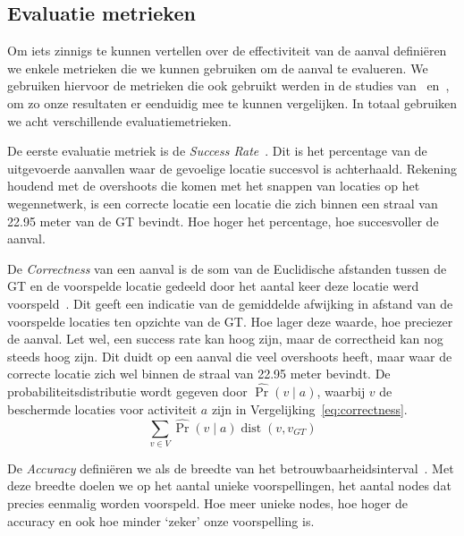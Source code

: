 \subsection{Evaluatie metrieken}
Om iets zinnigs te kunnen vertellen over de effectiviteit van de aanval
definiëren we enkele metrieken die we kunnen gebruiken om de aanval te
evalueren. We gebruiken hiervoor de metrieken die ook gebruikt werden in de
studies van~\citeauthor{Dhondt} en~\citeauthor{Verdonck_2022}, om zo onze
resultaten er eenduidig mee te kunnen vergelijken. In totaal gebruiken we acht
verschillende evaluatiemetrieken.

De eerste evaluatie metriek is de \textit{Success Rate}~\cite{Dhondt}. Dit is
het percentage van de uitgevoerde aanvallen waar de gevoelige locatie succesvol
is achterhaald. Rekening houdend met de overshoots die komen met het snappen
van locaties op het wegennetwerk, is een correcte locatie een locatie die zich
binnen een straal van 22.95 meter van de \ac{GT} bevindt. Hoe hoger het
percentage, hoe succesvoller de aanval.

De \textit{Correctness} van een aanval is de som van de Euclidische afstanden
tussen de \ac{GT} en de voorspelde locatie gedeeld door het aantal keer deze
locatie werd voorspeld~\cite{Dhondt, Verdonck_2022}. Dit geeft een indicatie
van de gemiddelde afwijking in afstand van de voorspelde locaties ten opzichte
van de \ac{GT}. Hoe lager deze waarde, hoe preciezer de aanval. Let wel, een
success rate kan hoog zijn, maar de correctheid kan nog steeds hoog zijn. Dit
duidt op een aanval die veel overshoots heeft, maar waar de correcte locatie
zich wel binnen de straal van 22.95 meter bevindt. De probabiliteitsdistributie
wordt gegeven door $\widehat{\operatorname{Pr}}(v \mid a)$, waarbij $v$ de
beschermde locaties voor activiteit $a$ zijn in
Vergelijking~\ref{eq:correctness}.
\begin{equation}
    \sum_{v \in V} \widehat{\operatorname{Pr}}(v \mid a) \operatorname{dist}\left(v, v_{G T}\right)\label{eq:correctness}
\end{equation}

De \textit{Accuracy} definiëren we als de breedte van het
betrouwbaarheidsinterval~\cite{Dhondt, Verdonck_2022}. Met deze breedte doelen
we op het aantal unieke voorspellingen, het aantal nodes dat precies eenmalig
worden voorspeld. Hoe meer unieke nodes, hoe hoger de accuracy en ook hoe
minder `zeker' onze voorspelling is.

